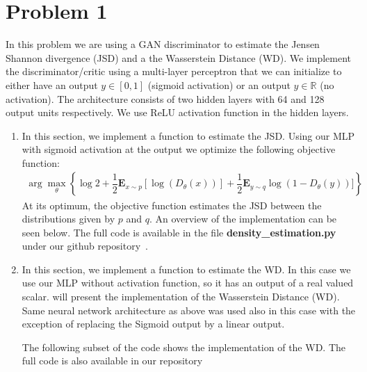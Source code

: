\section*{Problem 1}
In this problem we are using a GAN discriminator to estimate the Jensen Shannon divergence (JSD) and a the Wasserstein Distance (WD). We implement the discriminator/critic using a multi-layer perceptron that we can initialize to either have an output $y\in[0,1]$ (sigmoid activation) or an output $y\in\mathbb{R}$ (no activation). The architecture consists of two hidden layers with 64 and 128 output units respectively. We use ReLU activation function in the hidden layers.

\begin{enumerate}
	\item In this section, we implement a function to estimate the JSD. Using our MLP with sigmoid activation at the output we optimize the following objective function: 
	\begin{align*}
     \arg\max_{\theta}\left\{ \log2 + \dfrac{1}{2}\mathbf{E}_{x\sim p}[\log(D_\theta (x))] + \dfrac{1}{2}\mathbf{E}_{y\sim q}\log(1-D_\theta (y))]\right\}
	\end{align*}
	At its optimum, the objective function estimates the JSD between the distributions given by $p$ and $q$.
%	
%
	An overview of the implementation can be seen below. The full code is available in the file \textbf{density\_estimation.py} under our github repository~\cite{github}.
	
	
	
	\item In this section, we implement a function to estimate the WD. In this case we use our MLP without activation function, so it has an output of a real valued scalar.
	will present the implementation of the Wasserstein Distance (WD). Same neural network architecture as above was used also in this case with the exception of replacing the Sigmoid output by a linear output.
	
	The following subset of the code shows the implementation of the WD. The full code is also available in our repository~\cite{github}
	

\end{enumerate}
